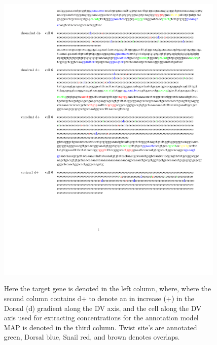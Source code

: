 %

\begin{figure}
  \includegraphics[height=1\textwidth]{annc}\\
  \caption{Here the target gene is denoted in the left column, where, where the second column contains d+ to denote an in increase (+) in the Dorsal (d) gradient along the DV axis, and the cell along the DV axis used for extracting concentrations for the annotation model MAP is denoted in the third column.  Twist site's are annotated green, Dorsal blue, Snail red, and brown denotes overlaps. }\label{annc}
\end{figure}
\pagebreak  
